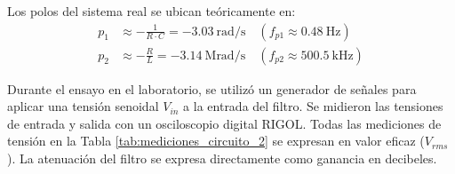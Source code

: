 Los polos del sistema real se ubican teóricamente en:
\begin{align}
  p_1 &\approx -\frac{1}{R \cdot C} = -\SI{3.03}{\radian\per\second} \quad (f_{p1} \approx \SI{0.48}{\hertz}) \\
  p_2 &\approx -\frac{R}{L} = -\SI{3.14}{\mega\radian\per\second} \quad (f_{p2} \approx \SI{500.5}{\kilo\hertz})
\end{align}

Durante el ensayo en el laboratorio, se utilizó un generador de señales para aplicar una tensión senoidal $V_{in}$ a la entrada del filtro. Se midieron las tensiones de entrada y salida con un osciloscopio digital RIGOL. Todas las mediciones de tensión en la Tabla \ref{tab:mediciones_circuito_2} se expresan en valor eficaz ($V_{rms}$). La atenuación del filtro se expresa directamente como ganancia en decibeles.


